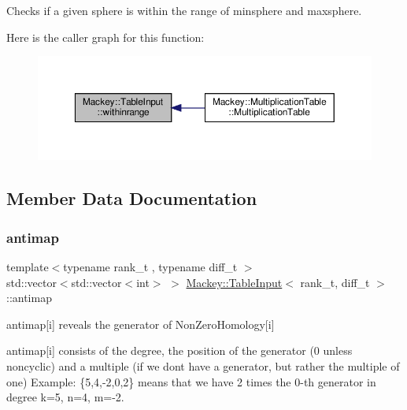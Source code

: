 Checks if a given sphere is within the range of minsphere and maxsphere. 

Here is the caller graph for this function\+:\nopagebreak
\begin{figure}[H]
\begin{center}
\leavevmode
\includegraphics[width=350pt]{classMackey_1_1TableInput_a8fc6c520589273fad3e606a8a72086a8_icgraph}
\end{center}
\end{figure}


\subsection{Member Data Documentation}
\mbox{\label{classMackey_1_1TableInput_ad85c480708a6b1a3e43725f10c818554}} 
\subsubsection{\texorpdfstring{antimap}{antimap}}
{\footnotesize\ttfamily template$<$typename rank\+\_\+t , typename diff\+\_\+t $>$ \\
std\+::vector$<$std\+::vector$<$int$>$ $>$ \hyperlink{classMackey_1_1TableInput}{Mackey\+::\+Table\+Input}$<$ rank\+\_\+t, diff\+\_\+t $>$\+::antimap\hspace{0.3cm}{\ttfamily [protected]}}



antimap\mbox{[}i\mbox{]} reveals the generator of Non\+Zero\+Homology\mbox{[}i\mbox{]} 

antimap\mbox{[}i\mbox{]} consists of the degree, the position of the generator (0 unless noncyclic) and a multiple (if we don\textquotesingle{}t have a generator, but rather the multiple of one) Example\+: \{5,4,-\/2,0,2\} means that we have 2 times the 0-\/th generator in degree k=5, n=4, m=-\/2. \mbox{\label{classMackey_1_1TableInput_aa612b7b41454848c19d3192ab6211ee4}} 
